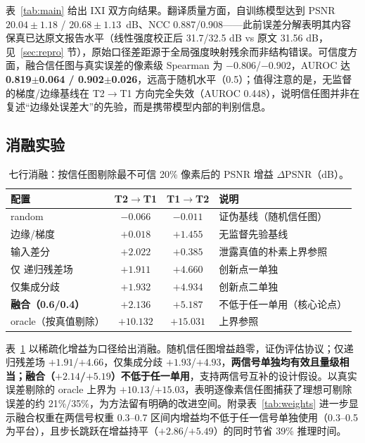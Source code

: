 \documentclass[11pt,a4paper]{ctexart}
\newcommand{\rcrf}{递归残差场}
\begin{document}
表~\ref{tab:main} 给出 IXI 双方向结果。翻译质量方面，自训练模型达到 PSNR $20.04{\pm}1.18$ / $20.68{\pm}1.13$~dB、NCC 0.887/0.908——此前误差分解表明其内容保真已达原文报告水平（线性强度校正后 31.7/32.5 dB vs 原文 31.56 dB，见~\ref{sec:repro} 节），原始口径差距源于全局强度映射残余而非结构错误。可信度方面，融合信任图与真实误差的像素级 Spearman 为 $-0.806$/$-0.902$，AUROC 达 \textbf{0.819$\pm$0.064 / 0.902$\pm$0.026}，远高于随机水平（0.5）；值得注意的是，无监督的梯度/边缘基线在 T2$\to$T1 方向完全失效（AUROC 0.448），说明信任图并非在复述``边缘处误差大''的先验，而是携带模型内部的判别信息。

\subsection{消融实验}

\begin{table}[htbp]
\centering\small
\caption{七行消融：按信任图剔除最不可信 20\% 像素后的 PSNR 增益 $\Delta$PSNR（dB）。}
\label{tab:ablation}
\begin{tabular}{lcc l}
\toprule
配置 & T2$\to$T1 & T1$\to$T2 & 说明 \\
\midrule
random & $-0.066$ & $-0.011$ & 证伪基线（随机信任图） \\
边缘/梯度 & $+0.018$ & $+1.455$ & 无监督先验基线 \\
输入差分 & $+2.022$ & $+0.385$ & 泄露真值的朴素上界参照 \\
仅 \rcrf & $+1.911$ & $+4.660$ & 创新点一单独 \\
仅集成分歧 & $+1.932$ & $+4.934$ & 创新点二单独 \\
\textbf{融合（0.6/0.4）} & $\boldsymbol{+2.136}$ & $\boldsymbol{+5.187}$ & 不低于任一单用（核心论点） \\
oracle（按真值剔除） & $+10.132$ & $+15.031$ & 上界参照 \\
\bottomrule
\end{tabular}
\end{table}

表~\ref{tab:ablation} 以稀疏化增益为口径给出消融。随机信任图增益趋零，证伪评估协议；仅递归残差场 $+1.91$/$+4.66$，仅集成分歧 $+1.93$/$+4.93$，\textbf{两信号单独均有效且量级相当；融合（$+2.14$/$+5.19$）不低于任一单用}，支持两信号互补的设计假设。以真实误差剔除的 oracle 上界为 $+10.13$/$+15.03$，表明逐像素信任图捕获了理想可剔除误差的约 21\%/35\%，为方法留有明确的改进空间。附录表~\ref{tab:weights} 进一步显示融合权重在两信号权重 0.3--0.7 区间内增益均不低于任一信号单独使用（0.3--0.5 为平台），且步长跳跃在增益持平（$+2.86$/$+5.49$）的同时节省 39\% 推理时间。
\end{document}

